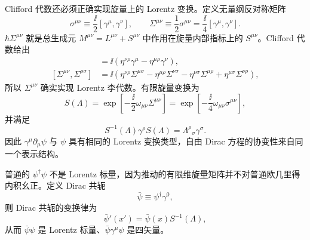 Clifford 代数还必须正确实现旋量上的 Lorentz 变换。定义无量纲反对称矩阵
\begin{equation}
 \sigma^{\mu\nu}\equiv\frac{\ii}{2}[\gamma^\mu,\gamma^\nu],
 \qquad
 \Sigma^{\mu\nu}\equiv\frac12\sigma^{\mu\nu}
 =\frac{\ii}{4}[\gamma^\mu,\gamma^\nu].
 \label{eq:sigma-definition}
\end{equation}
$\hbar\Sigma^{\mu\nu}$ 就是总生成元 $M^{\mu\nu}=L^{\mu\nu}+S^{\mu\nu}$ 中作用在旋量内部指标上的 $S^{\mu\nu}$。Clifford 代数给出
\begin{align}
 [\Sigma^{\mu\nu},\gamma^\rho]
 &=\ii\left(\eta^{\nu\rho}\gamma^\mu
 -\eta^{\mu\rho}\gamma^\nu\right),
 \label{eq:sigma-gamma-comm}\\
 [\Sigma^{\mu\nu},\Sigma^{\rho\sigma}]
 &=\ii\left(
 \eta^{\nu\rho}\Sigma^{\mu\sigma}
 -\eta^{\mu\rho}\Sigma^{\nu\sigma}
 -\eta^{\nu\sigma}\Sigma^{\mu\rho}
 +\eta^{\mu\sigma}\Sigma^{\nu\rho}
 \right),
 \label{eq:spinor-lorentz-algebra}
\end{align}
所以 $\Sigma^{\mu\nu}$ 确实实现 Lorentz 李代数。有限旋量变换为
\begin{equation}
 S(\Lambda)=
 \exp\!\left[-\frac{\ii}{2}\omega_{\mu\nu}\Sigma^{\mu\nu}\right]
 =\exp\!\left[-\frac{\ii}{4}\omega_{\mu\nu}\sigma^{\mu\nu}\right],
 \label{eq:spinor-lorentz-transform}
\end{equation}
并满足
\begin{equation}
 {
 S^{-1}(\Lambda)\gamma^\rho S(\Lambda)
 =\Lambda^\rho{}_{\sigma}\gamma^\sigma.}
 \label{eq:gamma-covariance}
\end{equation}
因此 $\gamma^\mu\partial_\mu\psi$ 与 $\psi$ 具有相同的 Lorentz 变换类型，自由 Dirac 方程的协变性来自同一个表示结构。

普通的 $\psi^\dagger\psi$ 不是 Lorentz 标量，因为推动的有限维旋量矩阵并不对普通欧几里得内积幺正。定义 Dirac 共轭
\begin{equation}
 {\bar\psi\equiv\psi^\dagger\gamma^0,}
 \label{eq:dirac-adjoint}
\end{equation}
则 Dirac 共轭的变换律为
\begin{equation}
 {\bar\psi'(x')=\bar\psi(x)S^{-1}(\Lambda),}
 \label{eq:dirac-adjoint-covariance-dp68}
\end{equation}
从而 $\bar\psi\psi$ 是 Lorentz 标量、$\bar\psi\gamma^\mu\psi$ 是四矢量。

